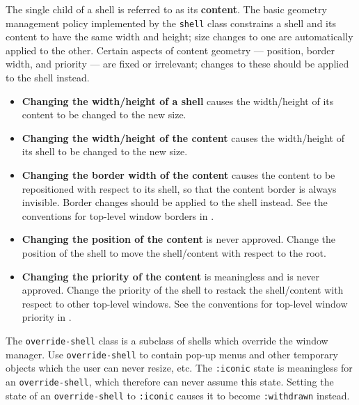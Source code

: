 The single child of a shell is referred to as its {\bf content}. The basic geometry management policy implemented by the {\tt shell}
class constrains a shell and its content to have the same width and height;
size changes to one are automatically applied to the other. Certain aspects of
content geometry --- position, border width, and priority --- are fixed or irrelevant;
changes to these should be applied to the shell instead.
        
\begin{itemize}
\item {\bf Changing the width/height of a shell} causes the width/height of its
content to be changed to the new size.

\item {\bf Changing the width/height of the content} causes the width/height of its
shell to be changed to the new size.

\item {\bf Changing the border width of the content} causes the content to be
repositioned with respect to its shell, so that the content border is always
invisible. Border changes should be applied to the shell instead. See the
conventions for top-level window borders in \cite{icccm}.

\item {\bf Changing the position of the content} is never approved. Change the
position of the shell to move the shell/content with respect to the root.

\item {\bf Changing the priority of the content} is meaningless and is never
approved.  Change the priority of the shell to restack the shell/content with
respect to other top-level windows.  See the conventions for top-level window
priority in \cite{icccm}.

\end{itemize}


The {\tt override-shell} class is a subclass of shells which override the window
manager.  Use {\tt override-shell} to contain pop-up menus and other temporary
objects which the user can never resize, etc.  The {\tt :iconic} state is
meaningless for an {\tt override-shell}, which therefore can never assume this
state.  Setting the state of an {\tt override-shell} to {\tt :iconic} causes it
to become {\tt :withdrawn} instead.

